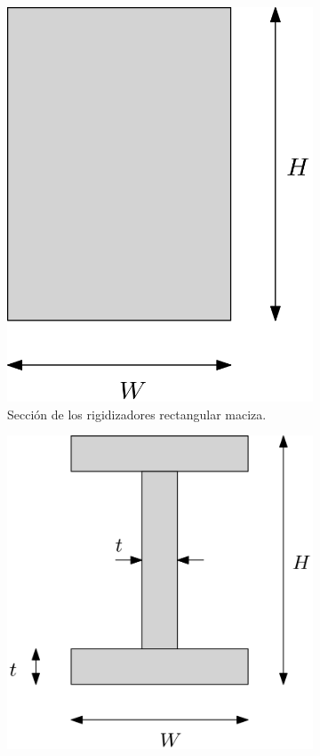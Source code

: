 \begin{figure}[H]  
  \begin{subfigure}[b]{0.5\linewidth}
  \centering
    \includegraphics[scale = 0.2]{Figures/SeccExt.png} 
    \caption{Sección de los rigidizadores rectangular maciza.}
  \end{subfigure} 
  \begin{subfigure}[b]{0.5\linewidth}
  \centering
    \includegraphics[scale = 0.2]{Figures/SeccI.png} 

\end{subfigure}
\end{figure}
